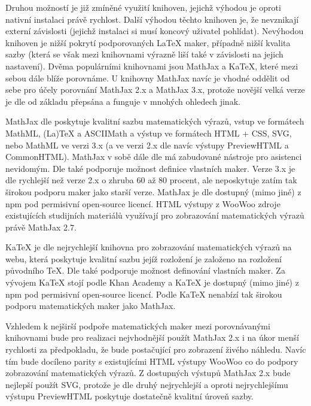 Druhou možností je již zmíněné využití knihoven, jejichž výhodou je oproti nativní instalaci právě rychlost. Další
výhodou těchto knihoven je, že nevznikají externí závislosti (jejichž instalaci si musí koncový uživatel pohlídat).
Nevýhodou knihoven je nižší pokrytí podporovaných \LaTeX{} maker, případně nižší kvalita sazby (která se však mezi
knihovnami výrazně liší také v závislosti na jejich nastavení). Dvěma populárními knihovnami jsou MathJax a KaTeX, které
mezi sebou dále blíže porovnáme. U knihovny MathJax navíc je vhodné oddělit od sebe pro účely porovnání MathJax 2.x a
MathJax 3.x, protože novější velká verze je dle \cite{mathjax3-docs} od základu přepsána a funguje v mnohých ohledech
jinak.

MathJax dle \cite{mathjax} poskytuje kvalitní sazbu matematických výrazů, vstup ve formátech MathML, (La)TeX a ASCIIMath
a výstup ve formátech HTML + CSS, SVG, nebo MathML ve verzi 3.x (a ve verzi 2.x dle \cite{mathjax2-docs} navíc výstupy
PreviewHTML a CommonHTML). MathJax v sobě dále dle \cite{mathjax} má zabudované nástroje pro asistenci nevidomým. Dle
\cite{mathjax3-docs} také podporuje možnost definice vlastních maker. Verze 3.x je dle \cite{mathjax3-docs} rychlejší
než verze 2.x o zhruba 60 až 80 procent, ale neposkytuje zatím tak širokou podporu maker jako starší verze. MathJax je
dle \cite{mathjax3-docs} dostupný (mimo jiné) z npm pod permisivní open-source licencí. HTML výstupy \cite{pkm} z WooWoo
zdroje existujících studijních materiálů využívají pro zobrazování matematických výrazů právě MathJax 2.7.

KaTeX je dle \cite{katex} nejrychlejší knihovna pro zobrazování matematických výrazů na webu, která poskytuje kvalitní
sazbu jejíž rozložení je založeno na rozložení původního \TeX{}. Dle \cite{katex-docs} také podporuje možnost definování
vlastních maker. Za vývojem KaTeX stojí podle \cite{katex} Khan Academy a KaTeX je dostupný (mimo jiné) z npm pod
permisivní open-source licencí. Podle \cite{danmackinlay} KaTeX nenabízí tak širokou podporu matematických maker jako
MathJax.

Vzhledem k nejširší podpoře matematických maker mezi porovnávanými knihovnami bude pro realizaci nejvhodnější použít
MathJax 2.x i na úkor menší rychlosti za předpokladu, že bude postačující pro zobrazení živého náhledu. Navíc tím bude
docíleno parity s existujícími HTML výstupy WooWoo co do podpory zobrazování matematických výrazů. Z dostupných výstupů
MathJax 2.x bude nejlepší použít SVG, protože je dle \cite{mathjax2-docs} druhý nejrychlejší a oproti nejrychlejšímu
výstupu PreviewHTML poskytuje dostatečně kvalitní úroveň sazby.

